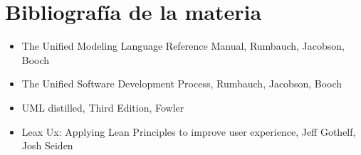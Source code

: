 \documentclass[titlepage,a4paper]{article}
\begin{document}
%




\section{Bibliografía de la materia}
\begin{itemize}
    \item The Unified Modeling Language Reference Manual, Rumbauch, Jacobson, Booch
    \item The Unified Software Development Process, Rumbauch, Jacobson, Booch
    \item UML distilled, Third Edition, Fowler
    \item Leax Ux: Applying Lean Principles to improve user experience, Jeff Gothelf, Josh Seiden
\end{itemize}
\end{document}
